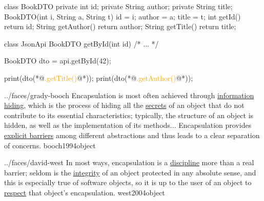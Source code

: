 \documentclass{article}
\begin{document}
\begin{lnSnippet}
class BookDTO {
  private int id;
  private String author;
  private String title;
  BookDTO(int i, String a, String t)
    { id = i; author = a; title = t; }
  int getId() { return id; }
  String getAuthor() { return author; }
  String getTitle() { return title; }
}
\end{lnSnippet}
\begin{lnSnippet}
class JsonApi {
  BookDTO getById(int id) { /* ... */ }
}

BookDTO dto = api.getById(42);

print(dto(*@\textcolor{orange}{.getTitle()}@*));
print(dto(*@\textcolor{orange}{.getAuthor()}@*));
\end{lnSnippet}


\lnQuote
  {../faces/grady-booch}
  {Encapsulation is most often achieved through \ul{information hiding}, which is the process of hiding all the \ul{secrets} of an object that do not contribute to its essential characteristics; typically, the structure of an object is hidden, as well as the implementation of its methods... Encapsulation provides \ul{explicit barriers} among different abstractions and thus leads to a clear separation of concerns.}
  {booch1994object}

\lnQuote
  {../faces/david-west}
  {In most ways, encapsulation is a \ul{discipline} more than a real barrier; seldom is the \ul{integrity} of an object protected in any absolute sense, and this is especially true of software objects, so it is up to the user of an object to \ul{respect} that object's encapsulation.}
  {west2004object}
\end{document}
